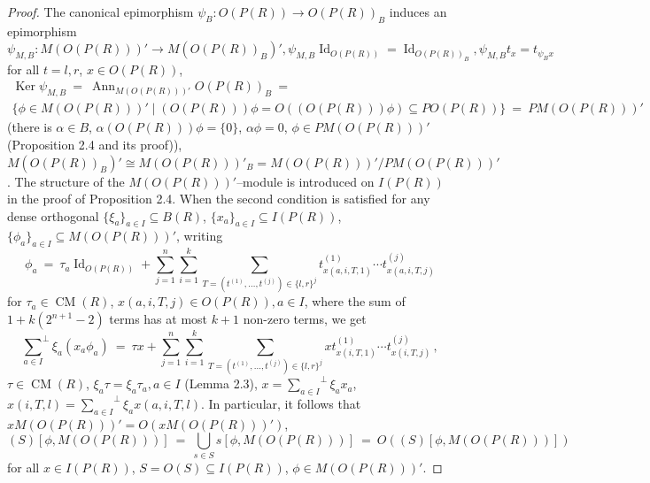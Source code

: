 \documentclass[a4paper,11pt]{article}
\DeclareMathOperator{\Id}{Id}
\DeclareMathOperator{\Ker}{Ker}
\DeclareMathOperator{\CM}{CM}
\DeclareMathOperator{\Ann}{Ann}
\begin{document}
\begin{proof}
The canonical epimorphism ${\psi_B: O(P(R))\longrightarrow O(P(R))_B}$ induces 
an epimorphism ${\psi_{M, B}: M(O(P(R)))'\longrightarrow M(O(P(R))_B)', 
\psi_{M, B} \Id_{O(P(R))}=\Id_{O(P(R))_B}, 
\psi_{M, B} t_x=t_{\psi_B x}}$ for all ${t=l, r}$, ${x\in O(P(R))}$, 
\begin{multline*}
\Ker \psi_{M, B}\ =\ \Ann_{M(O(P(R)))'} O(P(R))_B\ =
\\ 
\{\phi\in M(O(P(R)))'\mid (O(P(R)))\phi=O((O(P(R)))\phi)
\subseteq P O(P(R))\}\ =\ P M(O(P(R)))'
\end{multline*}
(there is ${\alpha\in B}$, ${\alpha (O(P(R)))\phi=\{0\}}$, ${\alpha \phi=0}$, 
${\phi\in P M(O(P(R)))'}$ (Proposition 2.4 and its proof)),
${M(O(P(R))_B)'\cong M(O(P(R)))'_B=M(O(P(R)))'/P M(O(P(R)))'}$. 
The structure of the $M(O(P(R)))'$--module is introduced on $I(P(R))$ in the 
proof of Proposition 2.4. When the second condition is satisfied for any dense 
orthogonal ${\{\xi_a\}_{a\in I}\subseteq B(R)}$, 
${\{x_a\}_{a\in I}\subseteq I(P(R))}$, 
${\{\phi_a\}_{a\in I}\subseteq M(O(P(R)))'}$, writing 
\[
\phi_a\ =\ \tau_a \Id_{O(P(R))}+
\sum_{j=1}^n \sum_{i=1}^k \sum_{T=(t^{(1)}, \ldots, t^{(j)})\in 
\{l, r\}^j} t^{(1)}_{x(a, i, T, 1)}\cdots t^{(j)}_{x(a, i, T, j)}
\]
for ${\tau_a\in \CM(R)}$, ${x(a, i, T, j)\in O(P(R)), a\in I}$, where the sum 
of ${1+k (2^{n+1}-2)}$ terms has at most ${k+1}$ non-zero terms, we get 
\[
{\sum_{a\in I}}^{\perp} \xi_a (x_a \phi_a)\ =\ 
\tau x+
\sum_{j=1}^n \sum_{i=1}^k \sum_{T=(t^{(1)}, \ldots, t^{(j)})\in 
\{l, r\}^j} x t^{(1)}_{x(i, T, 1)}\cdots t^{(j)}_{x(i, T, j)}\,,
\]
${\tau\in \CM(R)}$, ${\xi_a \tau=\xi_a \tau_a, a\in I}$ (Lemma 2.3), 
${x={\sum\limits_{a\in I}}^{\perp} \xi_a x_a}$, 
${x(i, T, l)={\sum\limits_{a\in I}}^{\perp} \xi_a x(a, i, T, l)}.$ 
In particular, it follows that ${x M(O(P(R)))'=O(x M(O(P(R)))')}$, 
\[
(S)[\phi, M(O(P(R)))]\ =\ 
\bigcup\limits_{s\in S} s [\phi, M(O(P(R)))]\ =\ O((S)[\phi, M(O(P(R)))])
\]
for all ${x\in I(P(R))}$, ${S=O(S)\subseteq I(P(R))}$, ${\phi\in M(O(P(R)))'}$.


\end{proof}
\end{document}
